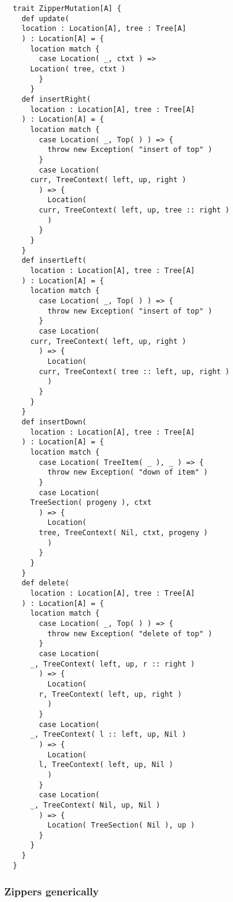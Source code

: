 \begin{lstlisting}
  trait ZipperMutation[A] {
    def update(
    location : Location[A], tree : Tree[A]
    ) : Location[A] = {
      location match {
        case Location( _, ctxt ) =>
	  Location( tree, ctxt )
        }
      }
    def insertRight(
      location : Location[A], tree : Tree[A]
    ) : Location[A] = {
      location match {
        case Location( _, Top( ) ) => {
          throw new Exception( "insert of top" )
        }
        case Location(
	  curr, TreeContext( left, up, right )
        ) => {
          Location(
	    curr, TreeContext( left, up, tree :: right )
          )	
        }
      }    
    }
    def insertLeft(
      location : Location[A], tree : Tree[A]
    ) : Location[A] = {
      location match {
        case Location( _, Top( ) ) => {
          throw new Exception( "insert of top" )
        }
        case Location(
	  curr, TreeContext( left, up, right )
        ) => {
          Location(
	    curr, TreeContext( tree :: left, up, right )
          )	
        }
      }    
    }
    def insertDown(
      location : Location[A], tree : Tree[A]
    ) : Location[A] = {
      location match {
        case Location( TreeItem( _ ), _ ) => {
          throw new Exception( "down of item" )
        }
        case Location(
	  TreeSection( progeny ), ctxt
        ) => {
          Location(
	    tree, TreeContext( Nil, ctxt, progeny )
          )
        }
      }
    }
    def delete(
      location : Location[A], tree : Tree[A]
    ) : Location[A] = {
      location match {
        case Location( _, Top( ) ) => {
          throw new Exception( "delete of top" )
        }
        case Location(
	  _, TreeContext( left, up, r :: right )
        ) => {
          Location(
	    r, TreeContext( left, up, right )
          )
        }
        case Location(
	  _, TreeContext( l :: left, up, Nil )
        ) => {
          Location(
	    l, TreeContext( left, up, Nil )
          )
        }
        case Location(
	  _, TreeContext( Nil, up, Nil )
        ) => {
          Location( TreeSection( Nil ), up )
        }
      }
    }
  }
\end{lstlisting}

\subsubsection{Zippers generically}

